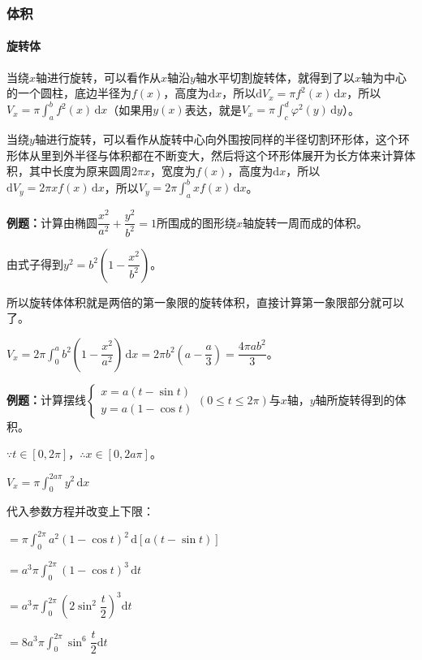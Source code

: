 \documentclass[UTF8, 12pt]{ctexart}
\begin{document}
\subsubsection{体积}

\paragraph{旋转体}  \leavevmode \medskip

当绕$x$轴进行旋转，可以看作从$x$轴沿$y$轴水平切割旋转体，就得到了以$x$轴为中心的一个圆柱，底边半径为$f(x)$，高度为$\textrm{d}x$，所以$\textrm{d}V_x=\pi f^2(x)\,\textrm{d}x$，所以$V_x=\pi\int_a^bf^2(x)\,\textrm{d}x$（如果用$y(x)$表达，就是$V_x=\pi\int_c^d\varphi^2(y)\,\textrm{d}y$）。

当绕$y$轴进行旋转，可以看作从旋转中心向外围按同样的半径切割环形体，这个环形体从里到外半径与体积都在不断变大，然后将这个环形体展开为长方体来计算体积，其中长度为原来圆周$2\pi x$，宽度为$f(x)$，高度为$\textrm{d}x$，所以$\textrm{d}V_y=2\pi xf(x)\,\textrm{d}x$，所以$V_y=2\pi\int_a^bxf(x)\,\textrm{d}x$。

\textbf{例题：}计算由椭圆$\dfrac{x^2}{a^2}+\dfrac{y^2}{b^2}=1$所围成的图形绕$x$轴旋转一周而成的体积。

由式子得到$y^2=b^2\left(1-\dfrac{x^2}{b^2}\right)$。

所以旋转体体积就是两倍的第一象限的旋转体积，直接计算第一象限部分就可以了。

$V_x=2\pi\displaystyle{\int_0^ab^2\left(1-\dfrac{x^2}{a^2}\right)\,\textrm{d}x}=2\pi b^2\left(a-\dfrac{a}{3}\right)=\dfrac{4\pi ab^2}{3}$。

\textbf{例题：}计算摆线$\left\{\begin{array}{l}
    x=a(t-\sin t) \\
    y=a(1-\cos t)
\end{array}
\right.$$(0\leqslant t\leqslant 2\pi)$与$x$轴，$y$轴所旋转得到的体积。

$\because t\in[0,2\pi]$，$\therefore x\in[0,2a\pi]$。

$V_x=\pi\int_0^{2a\pi}y^2\,\textrm{d}x$

代入参数方程并改变上下限：

$=\pi\int_0^{2\pi}a^2(1-\cos t)^2\,\textrm{d}[a(t-\sin t)]$

$=a^3\pi\int_0^{2\pi}(1-\cos t)^3\,\textrm{d}t$

$=a^3\pi\displaystyle{\int_0^{2\pi}\left(2\sin^2\dfrac{t}{2}\right)^3\textrm{d}t}$

$=8a^3\pi\displaystyle{\int_0^{2\pi}\sin^6\dfrac{t}{2}\textrm{d}t}$
\end{document}
